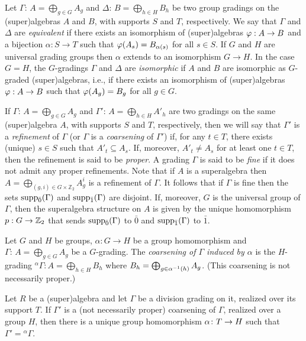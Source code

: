 Let $\Gamma:\,A=\bigoplus_{g\in G} A_g$ and $\Delta:\,B=\bigoplus_{h\in H} B_h$ be two group gradings on the (super)algebras $A$ and $B$, with supports $S$ and $T$, respectively.
We say that $\Gamma$ and $\Delta$ are {\em equivalent} if there exists an isomorphism of (super)algebras $\varphi: A\to B$ and a bijection $\alpha: S\to T$ such that $\varphi(A_s)=B_{\alpha(s)}$ for all $s\in S$. If $G$ and $H$ are universal grading groups then $\alpha$ extends to an isomorphism $G\to H$. In the case $G=H$, the $G$-gradings $\Gamma$ and $\Delta$ are {\em isomorphic} if $A$ and $B$ are isomorphic as $G$-graded (super)algebras, i.e., if there exists an isomorphism of (super)algebras $\varphi: A\to B$ such that $\varphi(A_g)=B_g$ for all $g\in G$.

If $\Gamma:\,A=\bigoplus_{g\in G} A_g$ and $\Gamma':\,A=\bigoplus_{h\in H} A'_h$ are two gradings on the same (super)algebra $A$, with supports $S$ and $T$, respectively, then we will say that $\Gamma'$ is a {\em refinement} of $\Gamma$ (or $\Gamma$ is a {\em coarsening} of $\Gamma'$) if, for any $t\in T$, there exists (unique) $s\in S$ such that $A'_t\subseteq A_s$. If, moreover, $A'_t\ne A_s$ for at least one $t\in T$, then the refinement is said to be {\em proper}. A grading $\Gamma$ is said to be {\em fine} if it does not admit any proper refinements. 
Note that if $A$ is a superalgebra then $A=\bigoplus_{(g,i)\in G\times\mathbb{Z}_2}A_g^i$ is a refinement of $\Gamma$. 
It follows that if $\Gamma$ is fine then the sets $\operatorname{supp}_{\bar{0}}(\Gamma)$ and $\operatorname{supp}_{\bar{1}}(\Gamma)$ are disjoint. 
If, moreover, $G$ is the universal group of $\Gamma$, then the superalgebra structure on $A$ is given by the unique homomorphism $p: G \to \mathbb{Z}_2$ 
that sends $\operatorname{supp}_{\bar{0}}(\Gamma)$ to $\bar 0$ and $\operatorname{supp}_{\bar{1}}(\Gamma)$ to $\bar 1$.

\begin{defi}
	Let $G$ and $H$ be groups, $\alpha:G\to H$ be a group homomorphism and $\Gamma:\,A=\bigoplus_{g\in G} A_g$ be a $G$-grading. The \emph{coarsening of $\Gamma$ induced by $\alpha$} is the $H$-grading ${}^\alpha \Gamma: A= \bigoplus_{h\in H} B_h$ where
	$ B_h = \bigoplus_{g\in \alpha^{-1} (h)} A_g$. (This coarsening is not necessarily proper.)
\end{defi}

\begin{lemma}\label{lemma:div-grd-unvrsl-grp}
    Let $R$ be a (super)algebra and let $\Gamma$ be a division grading on it, realized over its support $T$. 
    If $\Gamma'$ is a (not necessarily proper) coarsening of $\Gamma$, realized over a group $H$, then there is a unique group homomorphism $\alpha\colon T \to H$ such that $\Gamma' = {}^\alpha \Gamma$.
\end{lemma}

